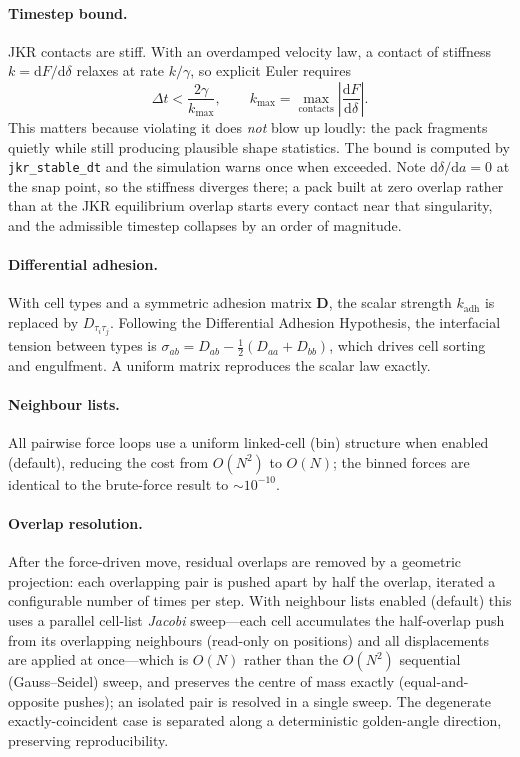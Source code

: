 \documentclass[11pt]{article}
\newcommand{\dt}{\Delta t}
\begin{document}
\paragraph{Timestep bound.} JKR contacts are stiff. With an overdamped velocity
law, a contact of stiffness $k=\mathrm{d}F/\mathrm{d}\delta$ relaxes at rate
$k/\gamma$, so explicit Euler requires
\begin{equation}
  \dt < \frac{2\gamma}{k_{\max}},\qquad
  k_{\max}=\max_{\text{contacts}}\left|\frac{\mathrm{d}F}{\mathrm{d}\delta}\right| .
\end{equation}
This matters because violating it does \emph{not} blow up loudly: the pack
fragments quietly while still producing plausible shape statistics. The bound is
computed by \texttt{jkr\_stable\_dt} and the simulation warns once when exceeded.
Note $\mathrm{d}\delta/\mathrm{d}a=0$ at the snap point, so the stiffness diverges
there; a pack built at zero overlap rather than at the JKR equilibrium overlap
starts every contact near that singularity, and the admissible timestep collapses
by an order of magnitude.

\paragraph{Differential adhesion.} With cell types and a symmetric adhesion
matrix $\bm{D}$, the scalar strength $k_{\text{adh}}$ is replaced by
$D_{\tau_i\tau_j}$. Following the Differential Adhesion Hypothesis, the
interfacial tension between types is
$\sigma_{ab} = D_{ab} - \tfrac{1}{2}(D_{aa}+D_{bb})$, which drives cell sorting
and engulfment. A uniform matrix reproduces the scalar law exactly.

\paragraph{Neighbour lists.} All pairwise force loops use a uniform linked-cell
(bin) structure when enabled (default), reducing the cost from $O(N^2)$ to
$O(N)$; the binned forces are identical to the brute-force result to
$\sim 10^{-10}$.

\paragraph{Overlap resolution.} After the force-driven move, residual overlaps
are removed by a geometric projection: each overlapping pair is pushed apart by
half the overlap, iterated a configurable number of times per step. With
neighbour lists enabled (default) this uses a parallel cell-list \emph{Jacobi}
sweep---each cell accumulates the half-overlap push from its overlapping
neighbours (read-only on positions) and all displacements are applied at
once---which is $O(N)$ rather than the $O(N^2)$ sequential (Gauss--Seidel)
sweep, and preserves the centre of mass exactly (equal-and-opposite pushes);
an isolated pair is resolved in a single sweep. The degenerate
exactly-coincident case is separated along a deterministic golden-angle
direction, preserving reproducibility.
\end{document}
